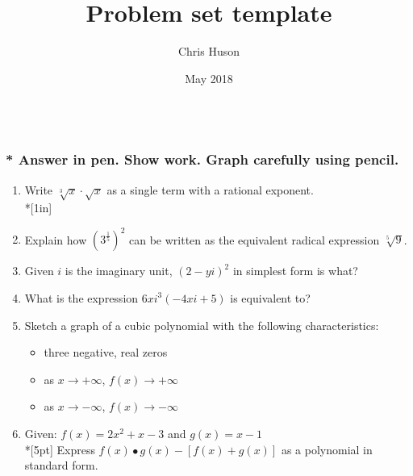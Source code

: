 \documentclass[12pt, oneside]{article}
\title{Problem set template}
\author{Chris Huson}
\date{May 2018}
\begin{document}

\subsubsection*{\\* \textnormal{Answer in pen. Show work. Graph carefully using pencil.}}

\begin{enumerate}


\item Write $\sqrt[3]x \cdot \sqrt{x}$ as a single term with a rational exponent. %
\\*[1in]

\item Explain how $\displaystyle \left(3^{\frac{1}{5}} \right)^2$ can be written as the equivalent radical expression $\sqrt[5]9$. \\[2in]%


\item Given $i$ is the imaginary unit, $(2-yi)^2$ in simplest form is what? \\[1.5in] %

\item What is the expression $6xi^3(-4xi+5)$ is equivalent to?  %
\newpage

\item Sketch a graph of a cubic polynomial with the following characteristics: 
\begin{itemize}
\item three negative, real zeros
\item as $x \rightarrow + \infty$, $f(x) \rightarrow + \infty$
\item as $x \rightarrow - \infty$, $f(x) \rightarrow - \infty$
\end{itemize}
\begin{center}
\end{center} %

\item Given: $f(x)=2x^2+ x - 3$ and $g(x)=x-1$\\*[5pt]
Express $f(x) \bullet g(x) - [f(x) + g(x)]$ as a polynomial in standard form. \\[3in]%


\end{enumerate}
\end{document}
